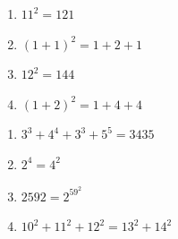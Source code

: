 \documentclass{book}
\begin{document}
\begin{minipage}{7cm}
\begin{enumerate}[font=\sffamily\bfseries,label=I.\arabic*), series=Is]
\item $11^2=121$
\item $(1+1)^2=1+2+1$
\item $12^2=144$
\item $(1+2)^2=1+4+4$
\end{enumerate}
\end{minipage} \hfill \begin{minipage}{7cm}
\begin{enumerate}[label=I.\arabic*),resume*=Is]
\item $3^3 + 4^4 + 3^3 + 5^5 = 3435$
\item $2^4 = 4^2$
\item $2592=2^59^2$
\item $10^2+11^2+12^2=13^2+14^2$
\end{enumerate}
\end{minipage}
\end{document}
